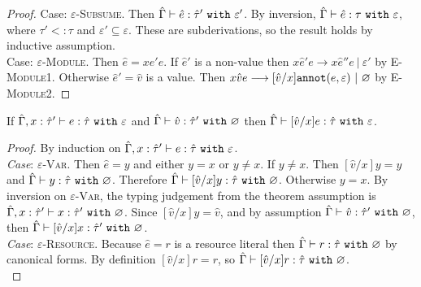 \begin{appendix}
\begin{proof}
Case: \textsc{$\varepsilon$-Subsume}. Then $\hat \Gamma \vdash \hat e: \hat \tau'~\mathtt{with}~ \varepsilon'$. By inversion, $\hat \Gamma \vdash \hat e: \tau~\mathtt{with}~ \varepsilon$, where $\tau' <: \tau$ and $\varepsilon' \subseteq \varepsilon$. These are subderivations, so the result holds by inductive assumption.\\

Case: \textsc{$\varepsilon$-Module}. Then $\hat e = {x}{\hat e'}{e}$. If $\hat e'$ is a non-value then ${x}{\hat e'}{e} \longrightarrow {x}{\hat e''}{e}~|~\varepsilon'$ by \textsc{E-Module1}. Otherwise $\hat e' = \hat v$ is a value. Then ${x}{\hat v}{e} \longrightarrow [\hat v/x]\mathtt{annot}(e, \varepsilon)~|~\varnothing$ by \textsc{E-Module2}.
\end{proof}


\hrulefill

\begin{lemma}[Substitution]
If $\hat \Gamma, x: \hat \tau' \vdash e: \hat \tau~\mathtt{with}~ \varepsilon$ and $\hat \Gamma \vdash \hat v: \hat \tau'~\mathtt{with}~ \varnothing$ then $\hat \Gamma \vdash [\hat v/x]e: \hat \tau~\mathtt{with}~ \varepsilon$.
\end{lemma}

\begin{proof} By induction on $\hat \Gamma, x: \hat \tau' \vdash e: \hat \tau~\mathtt{with}~ \varepsilon$. \\

\textit{Case}: \textsc{$\varepsilon$-Var}. Then $\hat e = y$ and either $y = x$ or $y \neq x$. If $y \neq x$. Then $[\hat v/x]y = y$ and $\hat \Gamma \vdash y: \hat \tau~\mathtt{with}~ \varnothing$. Therefore $\hat \Gamma \vdash [\hat v/x]y: \hat \tau~\mathtt{with}~ \varnothing$. Otherwise $y = x$. By inversion on \textsc{$\varepsilon$-Var}, the typing judgement from the theorem assumption is $\hat \Gamma, x: \hat \tau' \vdash x: \hat \tau'~\mathtt{with}~ \varnothing$. Since $[\hat v/x]y = \hat v$, and by assumption $\hat \Gamma \vdash \hat v: \hat \tau'~\mathtt{with}~ \varnothing$, then $\hat \Gamma \vdash [\hat v/x]x: \hat \tau'~\mathtt{with}~ \varnothing$. \\

\textit{Case}: \textsc{$\varepsilon$-Resource}. Because $\hat e = r$ is a resource literal then $\hat \Gamma \vdash r: \hat \tau~\mathtt{with}~ \varnothing$ by canonical forms. By definition $[\hat v/x]r = r$, so $\hat \Gamma \vdash [\hat v/x]r: \hat \tau~\mathtt{with}~ \varnothing$. \\


\end{proof}
\end{appendix}
